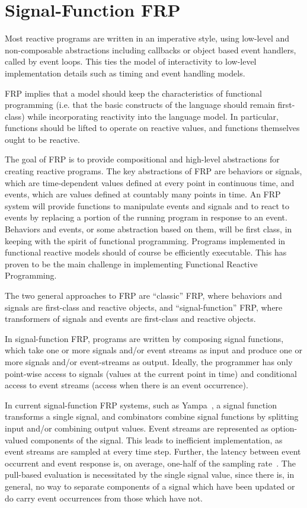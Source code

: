 \section{Signal-Function FRP}
\label{section:functional_reactive_programming}

Most reactive programs are written in an imperative style, using low-level and non-composable abstractions including callbacks
or object based event handlers, called by event loops. This ties the model of interactivity to low-level implementation details such as timing and event handling models. 

FRP implies that a model should keep the characteristics of functional programming (i.e. that the basic constructs of the language
should remain first-class) while incorporating reactivity into the language model. In particular, functions should be lifted to operate on reactive values,
and functions themselves ought to be reactive.

The goal of FRP is to provide compositional and high-level abstractions for creating reactive programs. The key
abstractions of FRP are behaviors or signals, which are time-dependent values defined at every point in continuous time, and events, which are 
values defined at countably many points in time. An FRP system will provide functions to manipulate events and signals and to react
to events by replacing a portion of the running program in response to an event. Behaviors and events, or some abstraction
based on them, will be first class, in keeping with the spirit of functional programming. Programs implemented in functional reactive
models should of course be efficiently executable. This has proven to be the main challenge in implementing Functional Reactive Programming.

The two general approaches to FRP are ``classic'' FRP, where behaviors and signals are first-class and reactive objects, and ``signal-function'' FRP,
where transformers of signals and events are first-class and reactive objects.

In signal-function FRP, programs are written by composing signal functions, which take one or more signals and/or event streams as input
and produce one or more signals and/or event-streams as output. Ideally, the programmer has only point-wise access to signals (values at the current
point in time) and conditional access to event streams (access when there is an event occurrence).

In current signal-function FRP systems, such as Yampa~\cite{Nilsson2005}, a signal function transforms a single signal,
and combinators combine signal functions by splitting input and/or combining output values. Event streams
are represented as option-valued components of the signal. This leads to inefficient implementation, as event streams
are sampled at every time step. Further, the latency between event occurrent and event response is, on average, one-half
of the sampling rate~\cite{Elliott2009}. The pull-based evaluation is necessitated by the single signal value, since
there is, in general, no way to separate components of a signal which have been updated or do carry event occurrences
from those which have not.

